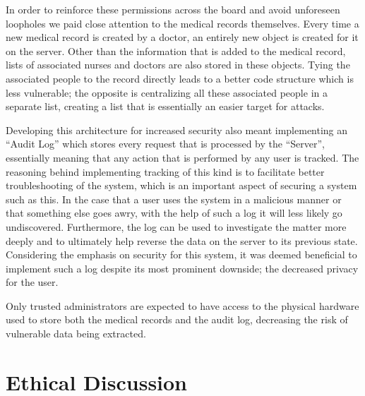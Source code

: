 \documentclass{article}
\begin{document}
In order to reinforce these permissions across the board and avoid unforeseen loopholes we paid close attention to the medical records themselves. Every time a new medical record is created by a doctor, an entirely new object is created for it on the server. Other than the information that is added to the medical record, lists of associated nurses and doctors are also stored in these objects. Tying the associated people to the record directly leads to a better code structure which is less vulnerable; the opposite is centralizing all these associated people in a separate list, creating a list that is essentially an easier target for attacks.

Developing this architecture for increased security also meant implementing an “Audit Log” which stores every request that is processed by the “Server”, essentially meaning that any action that is performed by any user is tracked. The reasoning behind implementing tracking of this kind is to facilitate better troubleshooting of the system, which is an important aspect of securing a system such as this. In the case that a user uses the system in a malicious manner or that something else goes awry, with the help of such a log it will less likely go undiscovered. Furthermore, the log can be used to investigate the matter more deeply and to ultimately help reverse the data on the server to its previous state. Considering the emphasis on security for this system, it was deemed beneficial to implement such a log despite its most prominent downside; the decreased privacy for the user. 

Only trusted administrators are expected to have access to the physical hardware used to store both the medical records and the audit log, decreasing the risk of vulnerable data being extracted.

\section*{Ethical Discussion}
\end{document}
